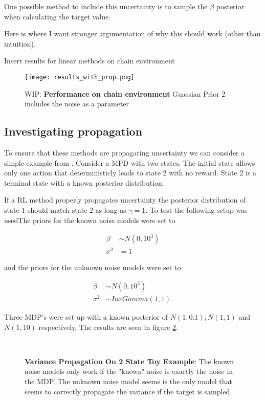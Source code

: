 One possible method to include this uncertainty is to sample the $\beta$ posterior when calculating the target value.

\todo Here is where I want stronger argumentation of why this should work (other than intuition).

\todo Insert results for linear methods on chain environment

\begin{figure}[H]
    \centering
    \texttt{[image: results\_with\_prop.png]}
    \caption{WIP: \textbf{Performance on chain environment} Guassian Prior 2 includes the noise as a parameter}
    \label{fig:results_no_propr}
\end{figure}

\subsection{Investigating propagation}

To ensure that these methods are propagating uncertainty we can consider a simple example from \cite{osband_2018}. Consider a MPD with two states. The initial state allows only one action that deterministicly leads to state 2 with no reward. State 2 is a terminal state with a known posterior distribution.

If a RL method properly propagates uncertainty the posterior distribution of state 1 should match state 2 as long as $\gamma=1$. To test the following setup was usedThe priors for the known noise models were set to

\begin{align*}
    \beta &\sim N(0,10^3)\\
    \sigma^2 &= 1
\end{align*}

and the priors for the unknown noise models were set to

\begin{align*}
    \beta &\sim N(0,10^3) \\
    \sigma^2 &\sim InvGamma(1,1).
\end{align*}

Three MDP's were set up with a known posterior of $N(1, 0.1), N(1, 1)$ and $N(1, 10)$ respectively. The results are seen in figure \ref{fig:proptest}.

\begin{figure}[H]
    \centering
    \\
    \caption{\textbf{Variance Propagation On 2 State Toy Example}: The known noise models only work if the "known" noise is exactly the noise in the MDP. The unknown noise model seems is the only model that seems to correctly propagate the variance if the target is sampled.}
    \label{fig:proptest}
\end{figure}

